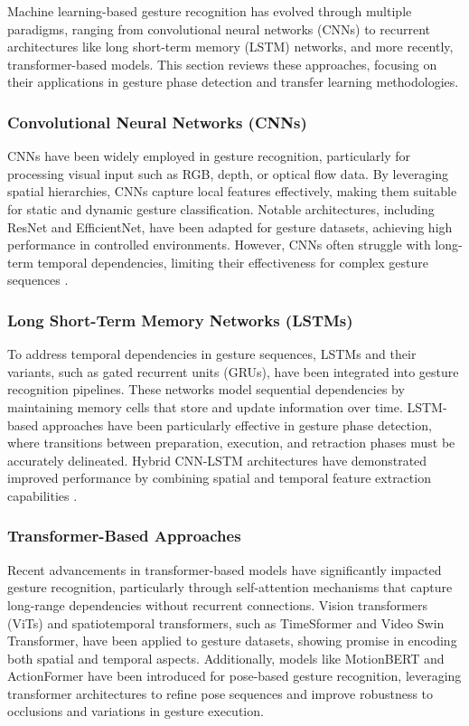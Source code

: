 Machine learning-based gesture recognition has evolved through multiple paradigms, ranging from convolutional neural networks (CNNs) to recurrent architectures like long short-term memory (LSTM) networks, and more recently, transformer-based models. This section reviews these approaches, focusing on their applications in gesture phase detection and transfer learning methodologies.

\subsubsection{Convolutional Neural Networks (CNNs)}
CNNs have been widely employed in gesture recognition, particularly for processing visual input such as RGB, depth, or optical flow data. By leveraging spatial hierarchies, CNNs capture local features effectively, making them suitable for static and dynamic gesture classification. Notable architectures, including ResNet and EfficientNet, have been adapted for gesture datasets, achieving high performance in controlled environments. However, CNNs often struggle with long-term temporal dependencies, limiting their effectiveness for complex gesture sequences \cite{chen2020cnn}.

\subsubsection{Long Short-Term Memory Networks (LSTMs)}
To address temporal dependencies in gesture sequences, LSTMs and their variants, such as gated recurrent units (GRUs), have been integrated into gesture recognition pipelines. These networks model sequential dependencies by maintaining memory cells that store and update information over time. LSTM-based approaches have been particularly effective in gesture phase detection, where transitions between preparation, execution, and retraction phases must be accurately delineated. Hybrid CNN-LSTM architectures have demonstrated improved performance by combining spatial and temporal feature extraction capabilities \cite{hu2018hybrid}.

\subsubsection{Transformer-Based Approaches}
Recent advancements in transformer-based models have significantly impacted gesture recognition, particularly through self-attention mechanisms that capture long-range dependencies without recurrent connections. Vision transformers (ViTs) and spatiotemporal transformers, such as TimeSformer and Video Swin Transformer, have been applied to gesture datasets, showing promise in encoding both spatial and temporal aspects. Additionally, models like MotionBERT and ActionFormer have been introduced for pose-based gesture recognition, leveraging transformer architectures to refine pose sequences and improve robustness to occlusions and variations in gesture execution.

